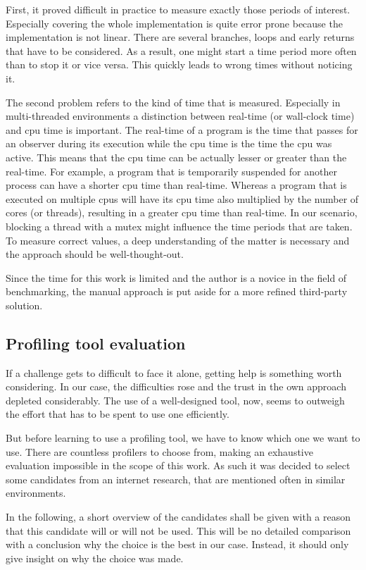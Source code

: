 First, it proved difficult in practice to measure exactly those periods of interest. Especially covering the whole implementation is quite error prone because the implementation is not linear. There are several branches, loops and early returns that have to be considered. As a result, one might start a time period more often than to stop it or vice versa. This quickly leads to wrong times without noticing it.

The second problem refers to the kind of time that is measured. Especially in multi-threaded environments a distinction between real-time (or wall-clock time) and cpu time is important. The real-time of a program is the time that passes for an observer during its execution while the cpu time is the time the cpu was active. This means that the cpu time can be actually lesser or greater than the real-time. For example, a program that is temporarily suspended for another process can have a shorter cpu time than real-time. Whereas a program that is executed on multiple cpus will have its cpu time also multiplied by the number of cores (or threads), resulting in a greater cpu time than real-time. In our scenario, blocking a thread with a mutex might influence the time periods that are taken. To measure correct values, a deep understanding of the matter is necessary and the approach should be well-thought-out.

Since the time for this work is limited and the author is a novice in the field of benchmarking, the manual approach is put aside for a more refined third-party solution.

\subsection{Profiling tool evaluation}
If a challenge gets to difficult to face it alone, getting help is something worth considering. In our case, the difficulties rose and the trust in the own approach depleted considerably. The use of a well-designed tool, now, seems to outweigh the effort that has to be spent to use one efficiently.

But before learning to use a profiling tool, we have to know which one we want to use. There are countless profilers to choose from, making an exhaustive evaluation impossible in the scope of this work. As such it was decided to select some candidates from an internet research, that are mentioned often in similar environments.

In the following, a short overview of the candidates shall be given with a reason that this candidate will or will not be used. This will be no detailed comparison with a conclusion why the choice is the best in our case. Instead, it should only give insight on why the choice was made.

